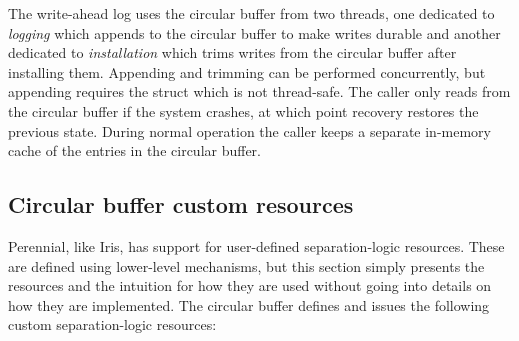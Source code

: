 The write-ahead log uses the circular buffer from two threads, one dedicated to
\emph{logging} which appends to the circular buffer to make writes durable and another
dedicated to \emph{installation} which trims writes from the circular buffer
after installing them. Appending and trimming can be performed concurrently, but
appending requires the  struct which is not thread-safe. The
caller only reads from the circular buffer if the system crashes, at which point
recovery restores the previous state. During normal operation the caller keeps a
separate in-memory cache of the entries in the circular buffer.

\subsection{Circular buffer custom resources}

Perennial, like Iris, has support for user-defined separation-logic resources.
These are defined using lower-level mechanisms, but this section simply presents the
resources and the intuition for how they are used without going into details on
how they are implemented. The circular buffer defines and issues the
following custom separation-logic resources:

\newcommand{\circstate}{\cc{circ_state}}
\newcommand{\startIs}{\cc{start_is}}
\newcommand{\diskendIs}{\cc{end_is}}

